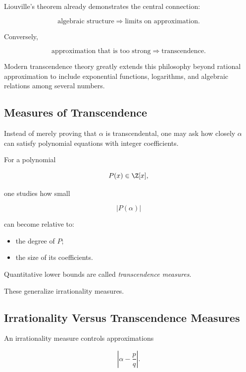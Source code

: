 Liouville's theorem already demonstrates the central connection:

\[
\text{algebraic structure}
\Longrightarrow
\text{limits on approximation}.
\]

Conversely,

\[
\text{approximation that is too strong}
\Longrightarrow
\text{transcendence}.
\]

Modern transcendence theory greatly extends this philosophy beyond rational
approximation to include exponential functions, logarithms, and algebraic
relations among several numbers.

\subsection{Measures of Transcendence}
\label{subsec:transcendence-measures}

Instead of merely proving that \(\alpha\) is transcendental, one may ask how
closely \(\alpha\) can satisfy polynomial equations with integer
coefficients.

For a polynomial

\[ P(x)\in\Z[x], \]

one studies how small

\[ |P(\alpha)| \]

can become relative to:

\begin{itemize}
    \item the degree of \(P\);
    \item the size of its coefficients.
\end{itemize}

Quantitative lower bounds are called \emph{transcendence measures}.

These generalize irrationality measures.

\subsection{Irrationality Versus Transcendence Measures}
\label{subsec:irrationality-vs-transcendence-measures}

An irrationality measure controls approximations

\[ \left|\alpha-\frac pq\right|. \]


